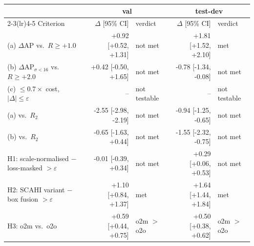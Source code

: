 \begin{tabular}{lrlrl}
\toprule
 & \multicolumn{2}{c}{val} & \multicolumn{2}{c}{test-dev} \\
\cmidrule(lr){2-3}\cmidrule(lr){4-5}
Criterion & $\Delta$ [95\% CI] & verdict & $\Delta$ [95\% CI] & verdict \\
\midrule
(a) $\Delta$AP vs.\ $R \geq +1.0$ & +0.92 {\scriptsize[+0.52, +1.31]} & not met & +1.81 {\scriptsize[+1.52, +2.10]} & met \\
(b) $\Delta$AP$_{\sigma<16}$ vs.\ $R \geq +2.0$ & +0.42 {\scriptsize[-0.50, +1.65]} & not met & -0.78 {\scriptsize[-1.34, -0.08]} & not met \\
(c) $\leq 0.7\times$ cost, $|\Delta|\leq\varepsilon$ & -- & not testable & -- & not testable \\
(a) vs.\ $R_2$ & -2.55 {\scriptsize[-2.98, -2.19]} & not met & -0.94 {\scriptsize[-1.25, -0.65]} & not met \\
(b) vs.\ $R_2$ & -0.65 {\scriptsize[-1.63, +0.44]} & not met & -1.55 {\scriptsize[-2.32, -0.75]} & not met \\
H1: scale-normalised $-$ loss-masked $> \varepsilon$ & -0.01 {\scriptsize[-0.39, +0.34]} & not met & +0.29 {\scriptsize[+0.06, +0.53]} & not met \\
H2: SCAHI variant $-$ box fusion $> \varepsilon$ & +1.10 {\scriptsize[+0.84, +1.37]} & met & +1.64 {\scriptsize[+1.44, +1.84]} & met \\
H3: o2m vs.\ o2o & +0.59 {\scriptsize[+0.44, +0.75]} & o2m $>$ o2o & +0.50 {\scriptsize[+0.38, +0.62]} & o2m $>$ o2o \\
\bottomrule
\end{tabular}
